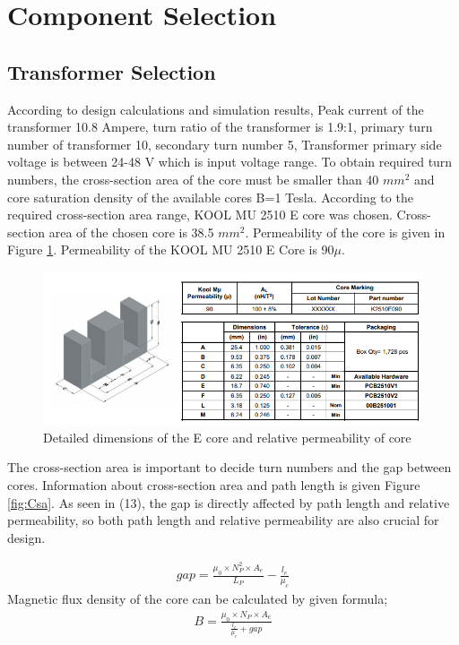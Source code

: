 \section{Component Selection}
\subsection{Transformer Selection}
According to design calculations and simulation results, Peak current of the transformer 10.8 Ampere, turn ratio of the transformer is 1.9:1, primary turn number of transformer 10, secondary turn number 5, Transformer primary side voltage is between 24-48 V which is input voltage range. To obtain required turn numbers, the cross-section area of the core must be smaller than 40 $mm^2$ and core saturation density of the available cores B=1 Tesla. According to the required cross-section area range, KOOL MU 2510 E core was chosen. Cross-section area of the chosen core is 38.5 $mm^2$. Permeability of the core is given in Figure \ref{fig:Permeability}. Permeability of the KOOL MU 2510 E Core is 90$\mu$. 

\begin{figure}[!h]
\centering
\includegraphics [width=1\textwidth]{core.png}
\caption{Detailed dimensions of the E core and relative permeability of core }
\label{fig:Permeability}
\end{figure}

The cross-section area is important to decide turn numbers and the gap between cores. Information about cross-section area and path length is given Figure \ref{fig:Csa}. As seen in (13), the gap is directly affected by path length and relative permeability, so both path length and relative permeability are also crucial for design.

\begin{align}
    gap=\frac{\mu_0\times N_P^2 \times A_e}{L_P}-\frac{l_e}{\mu_c}
\end{align}
Magnetic flux density of the core can be calculated by given formula;
\begin{align}
    B=\frac{\mu_0\times N_P\times A_e}{\frac{l_e}{\mu_c}+gap}
\end{align}

